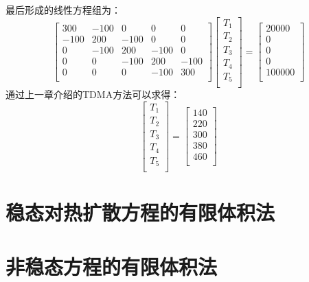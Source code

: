 最后形成的线性方程组为：
\begin{equation}
  \begin{bmatrix}
    300 & -100 & 0 & 0 & 0 \\
    -100 & 200 & -100 & 0 & 0 \\
    0 & -100 & 200 & -100 & 0 \\
    0 & 0 & -100 & 200 & -100  \\
    0 & 0 & 0 & -100 & 300 \\
  \end{bmatrix}
  \begin{bmatrix}
    T_{1} \\
    T_{2} \\
    T_{3} \\
    T_{4} \\
    T_{5} \\
  \end{bmatrix}
  =
  \begin{bmatrix}
    20000 \\
    0 \\
    0 \\
    0 \\
    100000 \\
  \end{bmatrix}
\end{equation}
通过上一章介绍的TDMA方法可以求得：
\begin{equation}
  \begin{bmatrix}
    T_{1} \\
    T_{2} \\
    T_{3} \\
    T_{4} \\
    T_{5} \\
  \end{bmatrix}
  =
  \begin{bmatrix}
    140 \\
    220 \\
    300 \\
    380 \\
    460 \\
  \end{bmatrix}
\end{equation}

\section{稳态对热扩散方程的有限体积法}

\section{非稳态方程的有限体积法}


